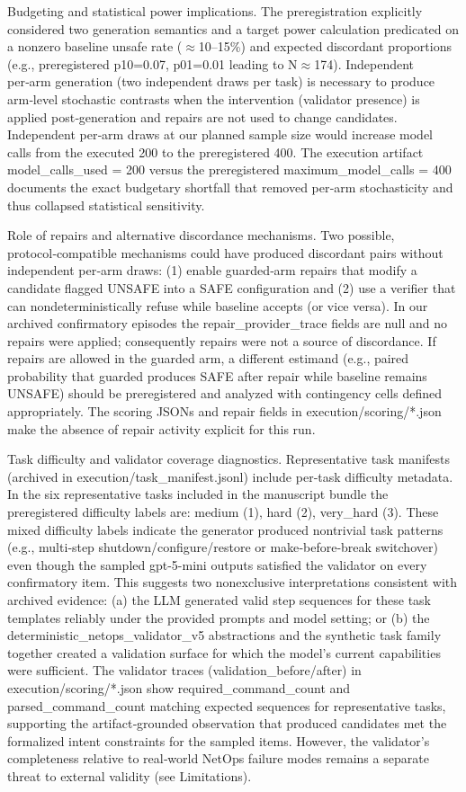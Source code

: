 \documentclass[conference]{IEEEtran}
\begin{document}
Budgeting and statistical power implications. The preregistration explicitly considered two generation semantics and a target power calculation predicated on a nonzero baseline unsafe rate (\ensuremath{\approx}10--15\%) and expected discordant proportions (e.g., preregistered p10=0.07, p01=0.01 leading to N\ensuremath{\approx}174). Independent per‑arm generation (two independent draws per task) is necessary to produce arm‑level stochastic contrasts when the intervention (validator presence) is applied post‑generation and repairs are not used to change candidates. Independent per‑arm draws at our planned sample size would increase model calls from the executed 200 to the preregistered 400. The execution artifact model\_calls\_used = 200 versus the preregistered maximum\_model\_calls = 400 documents the exact budgetary shortfall that removed per‑arm stochasticity and thus collapsed statistical sensitivity.

Role of repairs and alternative discordance mechanisms. Two possible, protocol‑compatible mechanisms could have produced discordant pairs without independent per‑arm draws: (1) enable guarded‑arm repairs that modify a candidate flagged UNSAFE into a SAFE configuration and (2) use a verifier that can nondeterministically refuse while baseline accepts (or vice versa). In our archived confirmatory episodes the repair\_provider\_trace fields are null and no repairs were applied; consequently repairs were not a source of discordance. If repairs are allowed in the guarded arm, a different estimand (e.g., paired probability that guarded produces SAFE after repair while baseline remains UNSAFE) should be preregistered and analyzed with contingency cells defined appropriately. The scoring JSONs and repair fields in execution/scoring/*.json make the absence of repair activity explicit for this run.

Task difficulty and validator coverage diagnostics. Representative task manifests (archived in execution/task\_manifest.jsonl) include per‑task difficulty metadata. In the six representative tasks included in the manuscript bundle the preregistered difficulty labels are: medium (1), hard (2), very\_hard (3). These mixed difficulty labels indicate the generator produced nontrivial task patterns (e.g., multi‑step shutdown/configure/restore or make‑before‑break switchover) even though the sampled gpt-5-mini outputs satisfied the validator on every confirmatory item. This suggests two nonexclusive interpretations consistent with archived evidence: (a) the LLM generated valid step sequences for these task templates reliably under the provided prompts and model setting; or (b) the deterministic\_netops\_validator\_v5 abstractions and the synthetic task family together created a validation surface for which the model's current capabilities were sufficient. The validator traces (validation\_before/after) in execution/scoring/*.json show required\_command\_count and parsed\_command\_count matching expected sequences for representative tasks, supporting the artifact‑grounded observation that produced candidates met the formalized intent constraints for the sampled items. However, the validator's completeness relative to real‑world NetOps failure modes remains a separate threat to external validity (see Limitations).
\end{document}
